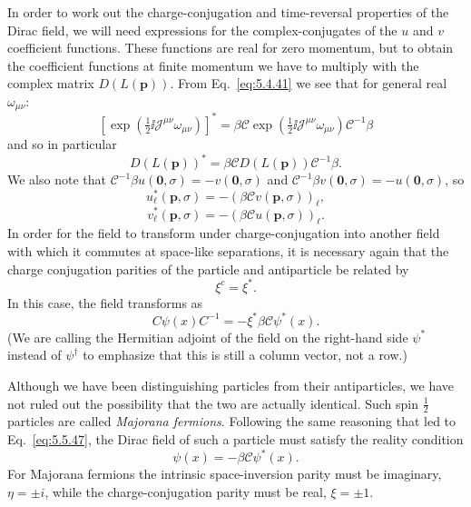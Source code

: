 In order to work out the charge-conjugation and time-reversal properties of
the Dirac field, we will need expressions for the complex-conjugates of the
$u$ and $v$ coefficient functions. These functions are real for zero momentum,
but to obtain the coefficient functions at finite momentum we have to multiply
with the complex matrix $D(L(\mathbf p))$. From Eq.~\eqref{eq:5.4.41} we see that for
general real $\omega_{\mu\nu}$:
\[
[\exp(\tfrac12\ii\mathcal{J}^{\mu\nu}\omega_{\mu\nu})]^*
=\beta\mathcal{C}\exp(\tfrac12\ii\mathcal{J}^{\mu\nu}\omega_{\mu\nu})
\mathcal{C}^{-1}\beta
\]
and so in particular
\[
D(L(\mathbf p))^*=\beta\mathcal{C}D(L(\mathbf p))\mathcal{C}^{-1}\beta.
\]
We also note that $\mathcal{C}^{-1}\beta u(\mathbf0,\sigma)=-v(\mathbf0,\sigma)$
and $\mathcal{C}^{-1}\beta v(\mathbf0,\sigma)=-u(\mathbf0,\sigma)$, so
\begin{equation}
u_\ell^*(\mathbf p,\sigma)=-(\beta\mathcal{C}v(\mathbf p,\sigma))_\ell,
\tag{5.5.44}\label{eq:5.5.44}
\end{equation}
\begin{equation}
v_\ell^*(\mathbf p,\sigma)=-(\beta\mathcal{C}u(\mathbf p,\sigma))_\ell.
\tag{5.5.45}\label{eq:5.5.45}
\end{equation}
In order for the field to transform under charge-conjugation into another
field with which it commutes at space-like separations, it is necessary again
that the charge conjugation parities of the particle and antiparticle be
related by
\begin{equation}
\xi^c=\xi^*.
\tag{5.5.46}\label{eq:5.5.46}
\end{equation}
In this case, the field transforms as
\begin{equation}
C\psi(x)C^{-1}=-\xi^*\beta\mathcal{C}\psi^*(x).
\tag{5.5.47}\label{eq:5.5.47}
\end{equation}
(We are calling the Hermitian adjoint of the field on the right-hand side
$\psi^*$ instead of $\psi^\dagger$ to emphasize that this is still a column
vector, not a row.)

Although we have been distinguishing particles from their antiparticles, we
have not ruled out the possibility that the two are actually identical. Such
spin $\frac12$ particles are called \emph{Majorana fermions}. Following the
same reasoning that led to Eq.~\eqref{eq:5.5.47}, the Dirac field of such a particle
must satisfy the reality condition
\begin{equation}
\psi(x)=-\beta\mathcal{C}\psi^*(x).
\tag{5.5.48}\label{eq:5.5.48}
\end{equation}
For Majorana fermions the intrinsic space-inversion parity must be imaginary,
$\eta=\mathbin{\pm}i$, while the charge-conjugation parity must be real,
$\xi=\mathbin{\pm}1$.

